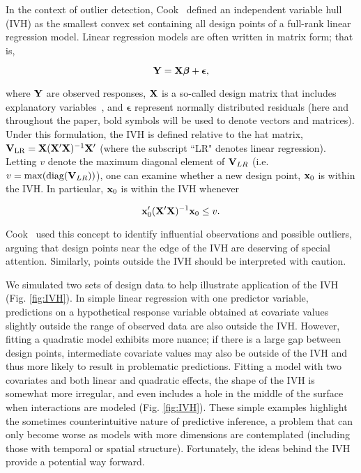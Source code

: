 \documentclass[10pt,letterpaper]{article}
\begin{document}
In the context of outlier detection, Cook~\cite{Cook1979} defined an independent variable hull (IVH) as the smallest convex set containing all design points of a full-rank linear regression model.  Linear regression models are often written in matrix form; that is,
\begin{linenomath*}
\begin{equation*}
  {\bf Y} = {\bf X} \boldsymbol{\beta} + \boldsymbol{\epsilon},
\end{equation*}
\end{linenomath*}
where ${\bf Y}$ are observed responses, ${\bf X}$ is a so-called design matrix that includes explanatory variables~\cite{Draper1966}, and $\boldsymbol{\epsilon}$ represent normally distributed residuals (here and throughout the paper, bold symbols will be used to denote vectors and matrices).
Under this formulation, the IVH is defined relative to the hat matrix, ${\bf V}_{\rm LR}={\bf X}({\bf X}^\prime{\bf X})^{-1}{\bf X}^\prime$ (where the subscript ``LR" denotes linear regression).  Letting $v$ denote the maximum diagonal element of ${\bf V}_{LR}$ (i.e. $v = \max(\textrm{diag}({\bf V}_{LR}))$), one can examine whether a new design point, ${\bf x}_0$ is within the IVH.  In particular, ${\bf x}_0$ is within the IVH whenever
\begin{linenomath*}
\begin{equation}
  \label{eq:IVH}
  {\bf x}_0^\prime ({\bf X}^\prime{\bf X})^{-1}{\bf x}_0 \le v.
\end{equation}
\end{linenomath*}
Cook~\cite{Cook1979} used this concept to identify influential observations and possible outliers, arguing that design points near the edge of the IVH are deserving of special attention.  Similarly, points outside the IVH should be interpreted with caution.

We simulated two sets of design data to help illustrate application of the IVH (Fig. \ref{fig:IVH}).  In simple linear regression with one predictor variable, predictions on a hypothetical response variable obtained at covariate values slightly outside the range of observed data are also outside the IVH.  However, fitting a quadratic model exhibits more nuance; if there is a large gap between design points, intermediate covariate values may also be outside of the IVH and thus more likely to result in problematic predictions.  Fitting a model with two covariates and both linear and quadratic effects, the shape of the IVH is somewhat more irregular, and even includes a hole in the middle of the surface when interactions are modeled (Fig. \ref{fig:IVH}).  These simple examples highlight the sometimes counterintuitive nature of predictive inference, a problem that can only become worse as models with more dimensions are contemplated (including those with temporal or spatial structure).  Fortunately, the ideas behind the IVH provide a potential way forward.
\end{document}
